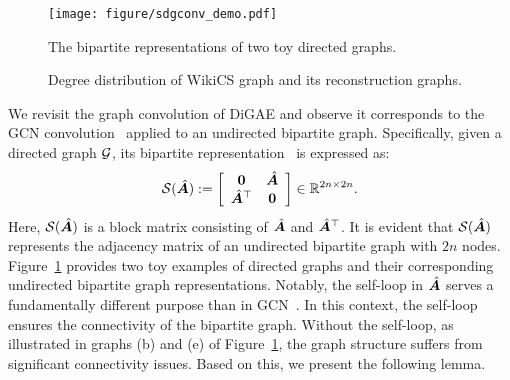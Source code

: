 \begin{figure}[t]
    \centering
   \texttt{[image: figure/sdgconv\_demo.pdf]}
   \vspace{-4mm}
    \caption{The bipartite representations of two toy directed graphs.}
    \label{fig:bg}
    \vspace{-1mm}
\end{figure}


\begin{figure*}[t]
    \centering
   \vspace{-3mm}
   \hspace{-3mm}
   \hspace{-7mm}
   \hspace{-7mm}
   \hspace{-7mm}
   \hspace{-7mm}
   
   \vspace{-3mm}
   \caption{Degree distribution of WikiCS graph and its reconstruction graphs.}
   \vspace{-3mm}
   \label{fig:degree_wiki}
\end{figure*}

We revisit the graph convolution of DiGAE and observe it corresponds to the GCN convolution~\cite{gcn} applied to an undirected bipartite graph. Specifically, given a directed graph ${\mathcal{G}}$, its bipartite representation~\cite{book_digraph} is expressed as:
\begin{equation}
    \mathcal{S}(\hat{{\bm{A}}}):=
    \left[ 
        \begin{array}{cc}
            \mathbf{0} & \hat{{\bm{A}}} \\
            \hat{{\bm{A}}}^{\top} & \mathbf{0}
        \end{array}
    \right] \in \mathbb{R}^{2n \times 2n}.
\end{equation}
Here, $\mathcal{S}(\hat{{\bm{A}}})$ is a block matrix consisting of $\hat{{\bm{A}}}$ and $\hat{{\bm{A}}}^{\top}$. It is evident that $\mathcal{S}(\hat{{\bm{A}}})$ represents the adjacency matrix of an undirected bipartite graph with $2n$ nodes. Figure~\ref{fig:bg} provides two toy examples of directed graphs and their corresponding undirected bipartite graph representations. Notably, the self-loop in $\hat{{\bm{A}}}$ serves a fundamentally different purpose than in GCN~\cite{gcn}. In this context, the self-loop ensures the connectivity of the bipartite graph. Without the self-loop, as illustrated in graphs (b) and (e) of Figure~\ref{fig:bg}, the graph structure suffers from significant connectivity issues. Based on this, we present the following lemma.

